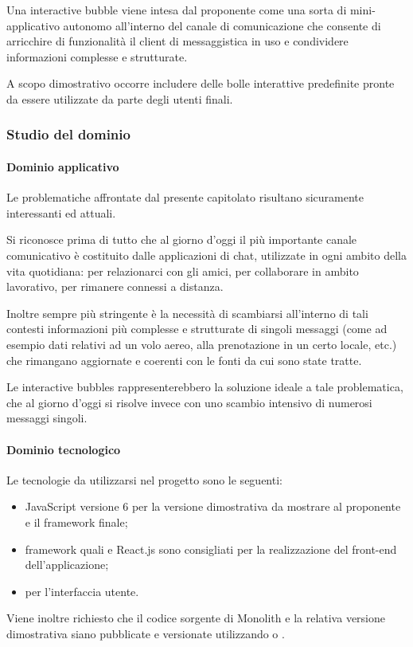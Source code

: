 		Una interactive bubble viene intesa dal proponente come una sorta di mini-applicativo autonomo all'interno del canale di comunicazione 
		che consente di arricchire di funzionalità il client di messaggistica in uso e condividere informazioni complesse e strutturate. 

		A scopo dimostrativo occorre includere delle bolle interattive predefinite pronte da essere utilizzate da parte degli utenti finali.
		
		\subsubsection{Studio del dominio}
			\paragraph{Dominio applicativo}
			Le problematiche affrontate dal presente capitolato risultano sicuramente interessanti ed attuali.

			Si riconosce prima di tutto che al giorno d'oggi il più importante canale comunicativo è costituito dalle applicazioni di chat, utilizzate in ogni ambito della vita quotidiana: per relazionarci con gli amici, per collaborare in ambito lavorativo, per rimanere 
			connessi a distanza.

			Inoltre sempre più stringente è la necessità di scambiarsi all'interno di tali contesti informazioni più complesse e strutturate di singoli messaggi (come ad esempio dati relativi ad un volo aereo, alla prenotazione in un certo locale, etc.) che rimangano aggiornate e coerenti con le fonti da cui sono state tratte.

			Le interactive bubbles rappresenterebbero la soluzione ideale a tale problematica, che al giorno d'oggi si risolve invece con uno scambio intensivo di numerosi messaggi singoli. 
			\paragraph{Dominio tecnologico}
			Le tecnologie da utilizzarsi nel progetto sono le seguenti:
			\begin{itemize}
				\item JavaScript versione 6 per la versione dimostrativa da mostrare al proponente e il framework finale;
				\item framework quali  e React.js sono consigliati per la realizzazione del front-end dell'applicazione;
				\item {} per l'interfaccia utente.
			\end{itemize}
			Viene inoltre richiesto che il codice sorgente di Monolith e la relativa versione dimostrativa siano pubblicate e versionate utilizzando 
			 o .
